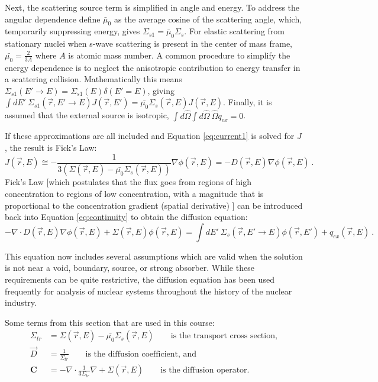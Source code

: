 \documentclass[12pt]{article}
\newlength{\up}
\newcommand{\ve}[1]{\ensuremath{\mathbf{#1}}}
\newcommand{\Macro}{\ensuremath{\Sigma}}
\newcommand{\vOmega}{\ensuremath{\hat{\Omega}}}
\begin{document}
Next, the scattering source term is simplified in angle and energy. To address the angular dependence define $\bar{\mu}_{0}$ as the average cosine of the scattering angle, which, temporarily suppressing energy, gives $\Macro_{s1} = \bar{\mu}_{0}\Macro_{s}$. For elastic scattering from stationary nuclei when s-wave scattering is present in the center of mass frame, $\bar{\mu_{0}} = \frac{2}{3A}$ where $A$ is atomic mass number. A common procedure to simplify the energy dependence is to neglect the anisotropic contribution to energy transfer in a scattering collision. Mathematically this means $\Macro_{s1}(E' \to E) = \Macro_{s1}(E) \delta(E' = E)$, giving $\int dE' \:\Macro_{s1}(\vec{r}, E' \to E)J(\vec{r},E') = \bar{\mu_{0}}\Macro_{s}(\vec{r},E)J(\vec{r},E)$. Finally, it is assumed that the external source is isotropic, $\int  d\vOmega \int d\vOmega \:\vOmega q_{ex} = 0$.

If these approximations are all included and Equation \eqref{eq:current1} is solved for $J$, the result is Fick's Law:
%
\begin{equation}
  J(\vec{r},E) \cong -\frac{1}{3(\Macro(\vec{r},E) - \bar{\mu_{0}}\Macro_{s}(\vec{r},E))} \nabla \phi (\vec{r},E) = -D(\vec{r},E) \nabla \phi (\vec{r},E) \:.
\end{equation}
%
Fick's Law [which postulates that the flux goes from regions of high concentration to regions of low concentration, with a magnitude that is proportional to the concentration gradient (spatial derivative) ] can be introduced back into Equation \eqref{eq:continuity} to obtain the diffusion equation:
%
\begin{equation}
  -\nabla \cdot D(\vec{r},E) \nabla \phi(\vec{r},E) + \Macro(\vec{r},E)\phi(\vec{r},E) = \int dE' \:\Macro_{s}(\vec{r}, E' \to E)\phi(\vec{r},E') + q_{ex}(\vec{r},E) \:.
  \label{eq:diffusion}
\end{equation}

This equation now includes several assumptions which are valid when the solution is not near a void, boundary, source, or strong absorber. While these requirements can be quite restrictive, the diffusion equation has been used frequently for analysis of nuclear systems throughout the history of the nuclear industry.

Some terms from this section that are used in this course:
\begin{align}
  \Macro_{tr} &= \Macro(\vec{r},E) - \bar{\mu_{0}}\Macro_{s}(\vec{r},E) \qquad \text{is the transport cross section,}\\
  \vec{D} &= \frac{1}{\Macro_{tr}} \qquad \text{is the diffusion coefficient, and}\\
  \ve{C} &= -\nabla \cdot \frac{1}{3\Macro_{tr}}\nabla+ \Macro(\vec{r},E) \qquad \text{is the diffusion operator.}
\end{align}
\end{document}
